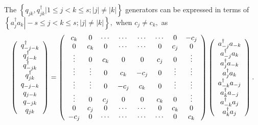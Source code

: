 \documentclass[aps,preprint]{revtex4}%
\begin{document}
The $\left\{  q_{jk},q_{jk}^{\dagger}\left\vert 1\leq j<k\leq s;\left\vert
j\right\vert \neq\left\vert k\right\vert \right.  \right\}  $ generators can
be expressed in terms of $\left\{  \left.  a_{j}^{\dagger}a_{k}\right\vert
-s\leq j<k\leq s;\left\vert j\right\vert \neq\left\vert k\right\vert \right\}
,$ when $c_{j}\neq c_{k},$ as
\begin{equation}
\left(
\begin{array}
[c]{c}%
q_{-j-k}^{\dagger}\\
q_{j-k}^{\dagger}\\
q_{-jk}^{\dagger}\\
q_{jk}^{\dagger}\\
q_{-j-k}\\
q_{j-k}\\
q_{-jk}\\
q_{jk}%
\end{array}
\right)  =\left(
\begin{array}
[c]{cccccccc}%
c_{k} & 0 & \cdots & \cdots & \cdots & \cdots & 0 & -c_{j}\\
0 & c_{k} & 0 & \cdots & \cdots & 0 & c_{j} & 0\\
\vdots & 0 & c_{k} & 0 & 0 & c_{j} & 0 & \vdots\\
\vdots & \vdots & 0 & c_{k} & -c_{j} & 0 & \vdots & \vdots\\
\vdots & \vdots & 0 & -c_{j} & c_{k} & 0 & \vdots & \vdots\\
\vdots & 0 & c_{j} & 0 & 0 & c_{k} & 0 & \vdots\\
0 & c_{j} & 0 & \cdots & \cdots & 0 & c_{k} & 0\\
-c_{j} & 0 & \cdots & \cdots & \cdots & \cdots & 0 & c_{k}%
\end{array}
\right)  \left(
\begin{array}
[c]{c}%
a_{-j}^{\dagger}a_{-k}\\
a_{-j}^{\dagger}a_{k}\\
a_{j}^{\dagger}a_{-k}\\
a_{j}^{\dagger}a_{k}\\
a_{-k}^{\dagger}a_{-j}\\
a_{k}^{\dagger}a_{-j}\\
a_{-k}^{\dagger}a_{j}\\
a_{k}^{\dagger}a_{j}%
\end{array}
\right)  .
\end{equation}%
\end{document}
